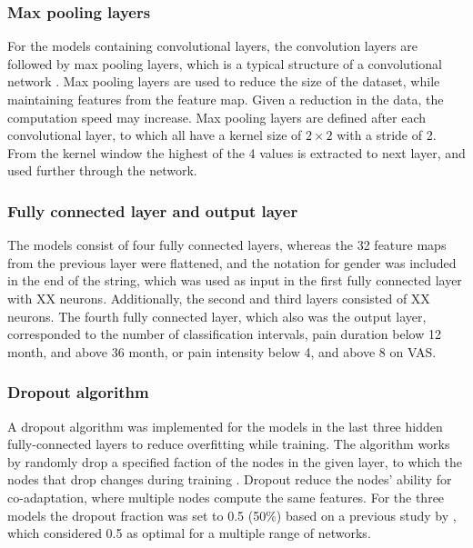 \subsubsection*{\textbf{Max pooling layers}}
For the models containing convolutional layers, the convolution layers are followed by max pooling layers, which is a typical structure of a convolutional network \citep{LeCun2015, Goodfellow2016}.
Max pooling layers are used to reduce the size of the dataset, while maintaining features from the feature map. Given a reduction in the data, the computation speed may increase.\citep{Goodfellow2016,LeCun1998} 
Max pooling layers are defined after each convolutional layer, to which all have a kernel size of $2 \times 2$ with a stride of 2. From the kernel window the highest of the 4 values is extracted to next layer, and used further through the network. 

\subsubsection*{\textbf{Fully connected layer and output layer}}
The models consist of four fully connected layers, whereas the 32 feature maps from the previous layer were flattened, and the notation for gender was included in the end of the string, which was used as input in the first fully connected layer with XX neurons. Additionally, the second and third layers consisted of XX neurons. The fourth fully connected layer, which also was the output layer, corresponded to the number of classification intervals, pain duration below 12 month, and above 36 month, or pain intensity below 4, and above 8 on VAS. 

\subsubsection*{\textbf{Dropout algorithm}}
A dropout algorithm was implemented for the models in the last three hidden fully-connected layers to reduce overfitting while training. The algorithm works by randomly drop a specified faction of the nodes in the given layer, to which the nodes that drop changes during training \citep{Srivastava2014}.  Dropout reduce the nodes’ ability for co-adaptation, where multiple nodes compute the same features. For the three models the dropout fraction was set to 0.5 (50\%) based on a previous study by \citeauthor{Srivastava2014} \citep{Srivastava2014}, which considered 0.5 as optimal for a multiple range of networks.   

